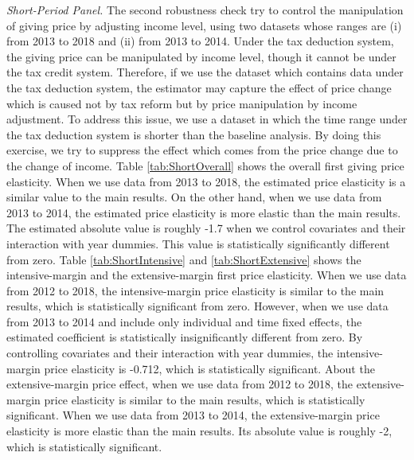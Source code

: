 \documentclass[
  11pt,
  a4paper,
]{article}
\begin{document}
\emph{Short-Period Panel.}
The second robustness check try to control the manipulation of giving price by adjusting income level,
using two datasets whose ranges are (i) from 2013 to 2018 and (ii) from 2013 to 2014.
Under the tax deduction system,
the giving price can be manipulated by income level,
though it cannot be under the tax credit system.
Therefore, if we use the dataset which contains data under the tax deduction system,
the estimator may capture the effect of price change
which is caused not by tax reform but by price manipulation by income adjustment.
To address this issue,
we use a dataset in which the time range under the tax deduction system is shorter than the baseline analysis.
By doing this exercise, we try to suppress the effect which comes from the price change due to the change of income.
Table \ref{tab:ShortOverall} shows the overall first giving price elasticity.
When we use data from 2013 to 2018, the estimated price elasticity is a similar value to the main results.
On the other hand,
when we use data from 2013 to 2014, the estimated price elasticity is more elastic than the main results.
The estimated absolute value is roughly -1.7 when we control covariates and their interaction with year dummies.
This value is statistically significantly different from zero.
Table \ref{tab:ShortIntensive} and \ref{tab:ShortExtensive} shows
the intensive-margin and the extensive-margin first price elasticity.
When we use data from 2012 to 2018, the intensive-margin price elasticity is similar to the main results,
which is statistically significant from zero.
However, when we use data from 2013 to 2014 and include only individual and time fixed effects,
the estimated coefficient is statistically insignificantly different from zero.
By controlling covariates and their interaction with year dummies,
the intensive-margin price elasticity is -0.712, which is statistically significant.
About the extensive-margin price effect,
when we use data from 2012 to 2018, the extensive-margin price elasticity is similar to the main results,
which is statistically significant.
When we use data from 2013 to 2014, the extensive-margin price elasticity is more elastic than the main results.
Its absolute value is roughly -2, which is statistically significant.
\end{document}
